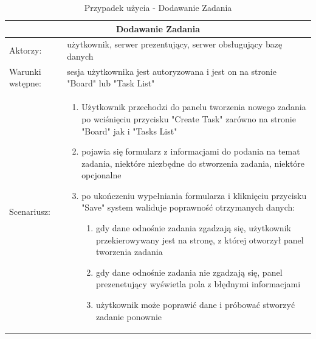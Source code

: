 \begin{table}[h!]
\begin{tabular}{ |p{2cm}||p{13cm}|  }
	
	\hline
	\multicolumn{2}{|c|}{Dodawanie Zadania} \\
	\hline
Aktorzy: &użytkownik, serwer prezentujący, serwer obsługujący bazę danych\\
	\hline
Warunki wstępne: &sesja użytkownika jest autoryzowana i jest on na stronie "Board" lub "Task List"\\
	\hline
	Scenariusz: &

\begin{enumerate}
	\item Użytkownik przechodzi do panelu tworzenia nowego zadania po wciśnięciu przycisku "Create Task" zarówno na stronie "Board" jak i "Tasks List"
	\item pojawia się formularz z informacjami do podania na temat zadania, niektóre niezbędne do stworzenia zadania, niektóre opcjonalne
	\item po ukończeniu wypełniania formularza i kliknięciu przycisku "Save" system waliduje poprawność otrzymanych danych:
	\begin{enumerate}
		\item gdy dane odnośnie zadania zgadzają się, użytkownik przekierowywany jest na stronę, z której otworzył panel tworzenia zadania
		\item gdy dane odnośnie zadania nie zgadzają się, panel prezenetujący wyświetla pola z błędnymi informacjami
		\item użytkownik może poprawić dane i próbować stworzyć zadanie ponownie
	\end{enumerate}
\end{enumerate}\\
\hline
\end{tabular}
	\caption{Przypadek użycia - Dodawanie Zadania}
\end{table}

